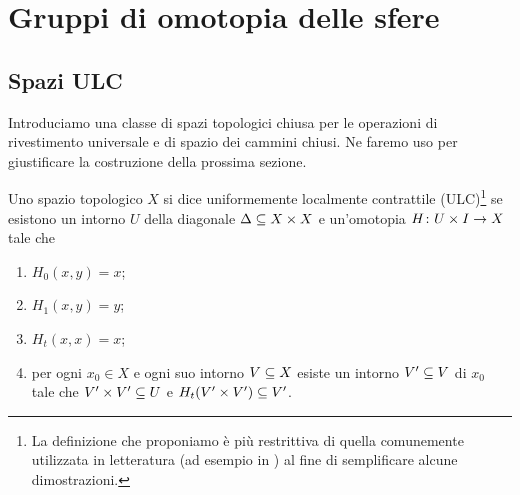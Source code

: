 \chapter{Gruppi di omotopia delle sfere}
\label{ch:homotopy-groups-of-spheres}
\section{Spazi ULC}

Introduciamo una classe di spazi topologici chiusa per le operazioni di rivestimento universale e di spazio dei cammini chiusi. Ne faremo uso per giustificare la costruzione della prossima sezione.

\begin{definition}
Uno spazio topologico $X$ si dice uniformemente localmente contrattile (ULC)\footnote{La definizione che proponiamo è più restrittiva di quella comunemente utilizzata in letteratura (ad esempio in ) al fine di semplificare alcune dimostrazioni.} se esistono un intorno $U$ della diagonale $\Delta\subseteq X\times X$ e un'omotopia $H\colon U\times I\to X$ tale che
\begin{enumerate}
\item\label{ULC:pr1} $H_0(x,y)=x$;
\item\label{ULC:pr2} $H_1(x,y)=y$;
\item\label{ULC:pr3} $H_t(x,x)=x$;
\item\label{ULC:pr4} per ogni $x_0\in X$ e ogni suo intorno $V\subseteq X$ esiste un intorno $V'\subseteq V$ di $x_0$ tale che $V'\times V'\subseteq U$ e $H_t(V'\times V')\subseteq V'$.
\end{enumerate}
\end{definition}

